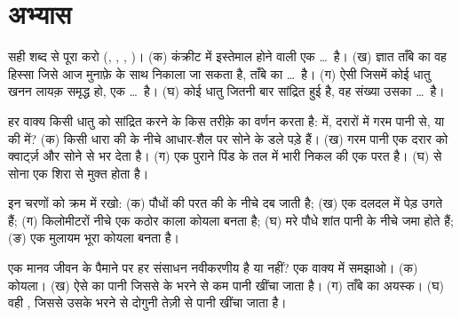 \section{अभ्यास}

\begin{exercise}[$\star$]\label{exo:g9:earth-resources:1}
सही शब्द से पूरा करो (, , , )। (क) कंक्रीट में इस्तेमाल
होने वाली  एक \ldots\ है। (ख) ज्ञात ताँबे का वह हिस्सा जिसे आज मुनाफ़े के साथ निकाला जा
सकता है, ताँबे का \ldots\ है। (ग) ऐसी  जिसमें कोई धातु खनन लायक़ समृद्ध हो, एक
\ldots\ है। (घ) कोई धातु जितनी बार सांद्रित हुई है, वह संख्या उसका \ldots\ है।
\end{exercise}

\begin{exercise}[$\star$]\label{exo:g9:earth-resources:2}
हर वाक्य किसी धातु को सांद्रित करने के किस तरीक़े का वर्णन करता है:  में, दरारों में
गरम पानी से, या  की  में? (क) किसी धारा की  के नीचे आधार-शैल पर सोने के डले
पड़े हैं। (ख) गरम पानी एक दरार को क्वार्ट्ज़ और सोने से भर देता है। (ग) एक पुराने 
पिंड के तल में भारी निकल  की एक परत है। (घ)  से सोना एक शिरा से मुक्त होता
है।
\end{exercise}

\begin{exercise}[$\star$]\label{exo:g9:earth-resources:3}
इन चरणों को क्रम में रखो: (क) पौधों की परत  की  के नीचे दब जाती है;
(ख) एक दलदल में पेड़ उगते हैं; (ग) किलोमीटरों नीचे एक कठोर काला कोयला बनता है;
(घ) मरे पौधे शांत पानी के नीचे जमा होते हैं; (ङ) एक मुलायम भूरा कोयला बनता है।
\end{exercise}

\begin{exercise}[$\star$]\label{exo:g9:earth-resources:4}
एक मानव जीवन के पैमाने पर हर संसाधन नवीकरणीय है या नहीं? एक वाक्य में समझाओ।
(क) कोयला। (ख) ऐसे  का पानी जिससे  के भरने से कम पानी खींचा जाता है। (ग) ताँबे
का अयस्क। (घ) वही , जिससे उसके भरने से दोगुनी तेज़ी से पानी खींचा
जाता है।
\end{exercise}

